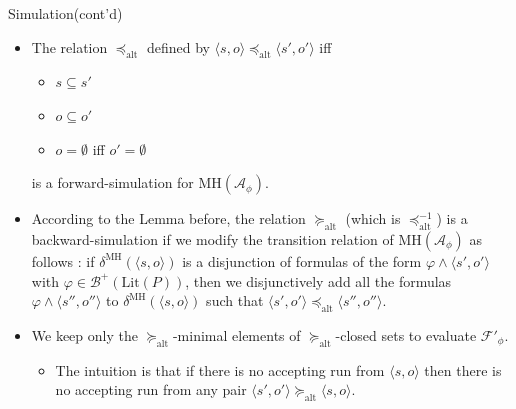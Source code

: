 \documentclass[12pt]{beamer}
\begin{document}
\begin{frame}{Simulation(cont'd)}
	\begin{itemize}
		\item The relation $\preceq_{\text{alt}}$ defined by $\langle s, o \rangle \preceq_{\text{alt}} \langle s', o' \rangle$ iff
		\begin{itemize}
			\item $s \subseteq s'$
			\item $o \subseteq o'$
			\item $o = \emptyset$ iff $o' = \emptyset$
		\end{itemize}
		is a forward-simulation for $\text{MH}(\mathcal{A}_{\phi})$.
		\item According to the Lemma before, the relation $\succeq_{\text{alt}}$ (which is $\preceq_{\text{alt}}^{-1}$) is a backward-simulation if we modify the transition relation of $\text{MH}(\mathcal{A}_{\phi})$ as follows : if $\delta^{\text{MH}}(\langle s, o \rangle)$ is a disjunction of formulas of the form $\varphi \land \langle s', o' \rangle$ with $\varphi \in \mathcal{B}^{+}(\text{Lit}(P))$, then we disjunctively add all the formulas $\varphi \land \langle s'', o'' \rangle$ to $\delta^{\text{MH}}(\langle s, o \rangle)$ such that $\langle s', o' \rangle \preceq_{\text{alt}} \langle s'', o'' \rangle$.
		\item We keep only the $\succeq_{\text{alt}}$-minimal elements of $\succeq_{\text{alt}}$-closed sets to evaluate $\mathcal{F}'_{\phi}$.
		\begin{itemize}
			\item The intuition is that if there is no accepting run from $\langle s, o \rangle$ then there is no accepting run from any pair $\langle s', o' \rangle \succeq_{\text{alt}} \langle s, o \rangle$.
		\end{itemize}
	\end{itemize}
\end{frame}
\end{document}
